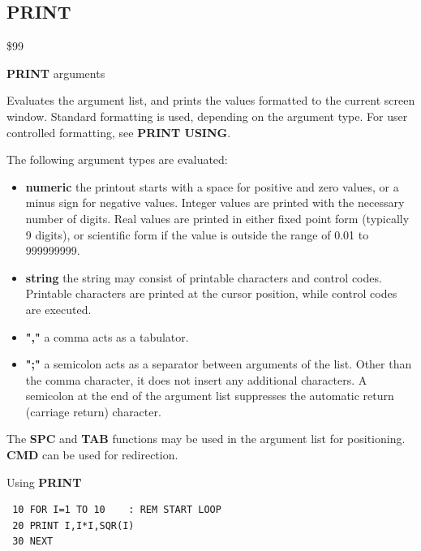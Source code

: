 \subsection{PRINT}
\begin{description}[leftmargin=2cm,style=nextline]
\item [Token:] \$99
\item [Format:] {\bf PRINT} arguments
\item [Usage:]  Evaluates the argument list, and prints the values
                formatted to the current screen window.
                Standard formatting is used, depending on the
                argument type. For user controlled formatting,
                see {\bf PRINT USING}.

                The following argument types are evaluated:
                \begin{itemize}
                    \item {\bf numeric} the printout starts with a space
                    for positive and zero values, or a minus sign for
                    negative values. Integer values are printed with
                    the necessary number of digits. Real values are
                    printed in either fixed point form (typically
                    9 digits), or scientific form if the value is
                    outside the range of 0.01 to 999999999.

                    \item {\bf string} the string may consist of printable
                    characters and control codes. Printable characters
                    are printed at the cursor position, while control
                    codes are executed.

                    \item {\bf ","} a comma acts as a tabulator.

                    \item {\bf ";"} a semicolon acts as a separator between
                    arguments of the list. Other than the comma character,
                    it does not insert any additional characters.
                    A semicolon at the end of the argument list suppresses
                    the automatic return (carriage return) character.
                \end{itemize}
\item [Remarks:] The {\bf SPC} and {\bf TAB} functions
                 may be used in the argument list
                 for positioning.
                 {\bf CMD} can be used for redirection.

\item [Example:] Using {\bf PRINT}

\begin{tcolorbox}[colback=black,coltext=white]
\verbatimfont{\codefont}
\begin{verbatim}
 10 FOR I=1 TO 10    : REM START LOOP
 20 PRINT I,I*I,SQR(I)
 30 NEXT
\end{verbatim}
\end{tcolorbox}
\end{description}

